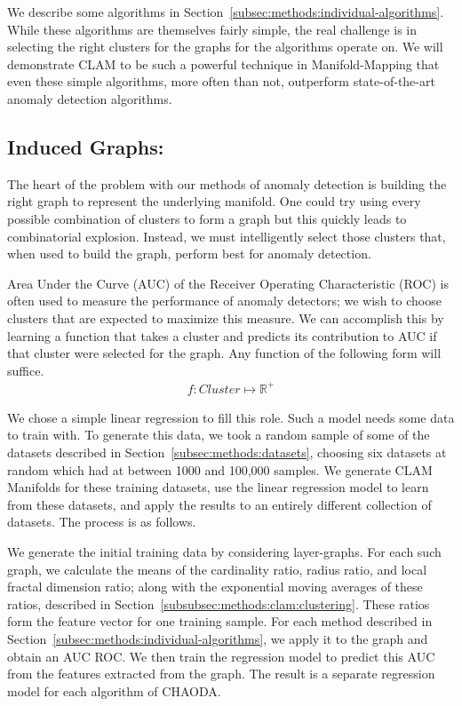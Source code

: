 We describe some algorithms in Section~\ref{subsec:methods:individual-algorithms}.
While these algorithms are themselves fairly simple, the real challenge is in selecting the right clusters for the graphs for the algorithms operate on.
We will demonstrate CLAM to be such a powerful technique in Manifold-Mapping that even these simple algorithms, more often than not, outperform state-of-the-art anomaly detection algorithms.

\subsection{Induced Graphs:}
\label{subsec:methods:induced-graphs}
The heart of the problem with our methods of anomaly detection is building the right graph to represent the underlying manifold.
One could try using every possible combination of clusters to form a graph but this quickly leads to combinatorial explosion.
Instead, we must intelligently select those clusters that, when used to build the graph, perform best for anomaly detection.

Area Under the Curve (AUC) of the Receiver Operating Characteristic (ROC) is often used to measure the performance of anomaly detectors;
we wish to choose clusters that are expected to maximize this measure.
We can accomplish this by learning a function that takes a cluster and predicts its contribution to AUC if that cluster were selected for the graph.
Any function of the following form will suffice.
\begin{gather*}
    f: Cluster \mapsto \mathbb{R}^+
\end{gather*}

We chose a simple linear regression to fill this role.
Such a model needs some data to train with.
To generate this data, we took a random sample of some of the datasets described in Section~\ref{subsec:methods:datasets}, choosing six datasets at random which had at between 1000 and 100,000 samples.
We generate CLAM Manifolds for these training datasets, use the linear regression model to learn from these datasets, and apply the results to an entirely different collection of datasets. The process is as follows.

We generate the initial training data by considering layer-graphs.
For each such graph, we calculate the means of the cardinality ratio, radius ratio, and local fractal dimension ratio;
along with the exponential moving averages of these ratios, described in Section~\ref{subsubsec:methods:clam:clustering}.
These ratios form the feature vector for one training sample.
For each method described in Section~\ref{subsec:methods:individual-algorithms}, we apply it to the graph and obtain an AUC ROC\@.
We then train the regression model to predict this AUC from the features extracted from the graph.
The result is a separate regression model for each algorithm of CHAODA.


